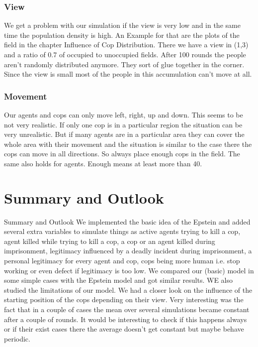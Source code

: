 \documentclass[11pt]{article}
\begin{document}
\subsubsection{View}
We get a problem with our simulation if the view is very low and in the same time the population density is high. An Example for that are the plots of the field in the chapter Influence of Cop Distribution.\newline
There we have a view in (1,3) and a ratio of 0.7 of occupied to unoccupied fields. After 100 rounds the people aren’t randomly distributed anymore. They sort of glue together in the corner. Since the view is small most of the people in this accumulation can’t move at all.\newline\newline

\subsubsection{Movement}
Our agents and cops can only move left, right, up and down. This seems to be not very realistic. If only one cop is in a particular region the situation can be very unrealistic. But if many agents are in a particular area they can cover the whole area with their movement and the situation is similar to the case there the cops can move in all directions. So always place enough cops in the field. The same also holds for agents. Enough means at least more than 40.

\newpage

\section{Summary and Outlook}

Summary and Outlook\newline
We implemented the basic idea of the Epstein and added several extra variables to simulate things as active agents trying to kill a cop, agent killed while trying to kill a cop, a cop or an agent killed during imprisonment, legitimacy influenced by a deadly incident during imprisonment, a personal legitimacy for every agent and cop, cops being more human i.e. stop working or even defect if legitimacy is too low.\newline
We compared our (basic) model in some simple cases with the Epstein model and got similar results. WE also studied the limitations of our model. We had a closer look on the influence of the starting position of the cops depending on their view.  Very interesting was the fact that in a couple of cases the mean over several simulations became constant after a couple of rounds. It would be interesting to check if this happens always or if their exist cases there the average doesn’t get constant but maybe behave periodic.
\end{document}
